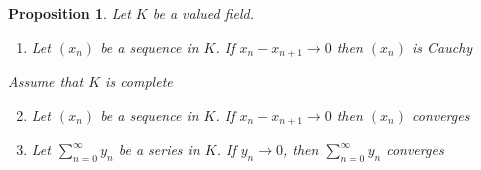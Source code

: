 \documentclass[a4paper]{article}
\newtheorem{prop}{Proposition}
\begin{document}
\begin{prop}
	Let $K$ be a valued field.
	\begin{enumerate}[label=\roman*.]
		\item Let $(x_n)$ be a sequence in $K$. If $x_n - x_{n+1} \to 0$ then $(x_n)$ is Cauchy
	\end{enumerate}
	Assume that $K$ is complete
	\begin{enumerate}[label=\roman*.]
		\setcounter{enumi}{1}
		\item Let $(x_n)$ be a sequence in $K$. If $x_n - x_{n+1} \to 0$ then $(x_n)$ converges
		\item Let $\sum_{n=0}^{\infty}y_n$ be a series in $K$. If $y_n\to0$, then $\sum_{n=0}^{\infty}y_n$ converges
	\end{enumerate}
\end{prop}
	
\end{document}

